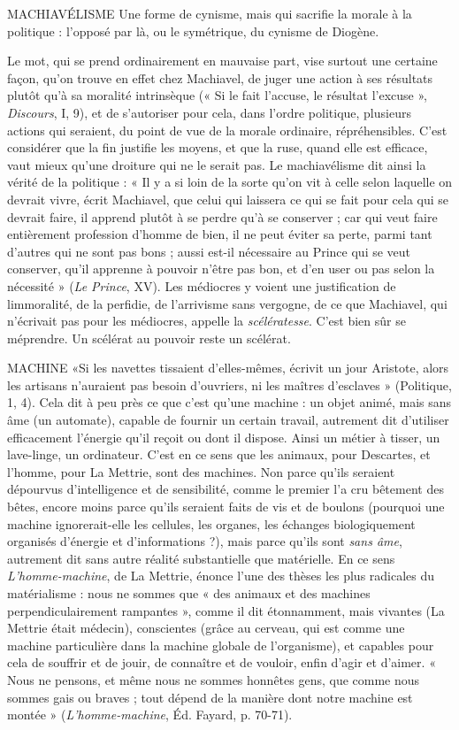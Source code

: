 

MACHIAVÉLISME Une forme de cynisme, mais qui sacrifie la morale à la
politique : l'opposé par là, ou le symétrique, du cynisme
de Diogène.

Le mot, qui se prend ordinairement en mauvaise part, vise surtout une certaine
façon, qu’on trouve en effet chez Machiavel, de juger une action à ses
résultats plutôt qu’à sa moralité intrinsèque (« Si le fait l’accuse, le résultat
l’excuse », {\it Discours}, I, 9), et de s’autoriser pour cela, dans l’ordre politique, plusieurs
actions qui seraient, du point de vue de la morale ordinaire, répréhensibles.
C’est considérer que la fin justifie les moyens, et que la ruse, quand elle
est efficace, vaut mieux qu’une droiture qui ne le serait pas. Le machiavélisme
dit ainsi la vérité de la politique : « Il y a si loin de la sorte qu’on vit à celle selon
laquelle on devrait vivre, écrit Machiavel, que celui qui laissera ce qui se fait
pour cela qui se devrait faire, il apprend plutôt à se perdre qu’à se conserver ;
car qui veut faire entièrement profession d'homme de bien, il ne peut éviter sa
perte, parmi tant d’autres qui ne sont pas bons ; aussi est-il nécessaire au Prince
qui se veut conserver, qu’il apprenne à pouvoir n'être pas bon, et d’en user ou
pas selon la nécessité » ({\it Le Prince}, XV). Les médiocres y voient une justification
de limmoralité, de la perfidie, de l’arrivisme sans vergogne, de ce que
Machiavel, qui n’écrivait pas pour les médiocres, appelle la {\it scélératesse}. C’est
bien sûr se méprendre. Un scélérat au pouvoir reste un scélérat.

MACHINE «Si les navettes tissaient d’elles-mêmes, écrivit un jour Aristote,
alors les artisans n'auraient pas besoin d’ouvriers, ni les
maîtres d'esclaves » (Politique, 1, 4). Cela dit à peu près ce que c’est qu’une
machine : un objet animé, mais sans âme (un automate), capable de fournir un
certain travail, autrement dit d’utiliser efficacement l'énergie qu’il reçoit ou
dont il dispose. Ainsi un métier à tisser, un lave-linge, un ordinateur. C’est en
ce sens que les animaux, pour Descartes, et l’homme, pour La Mettrie, sont des
machines. Non parce qu’ils seraient dépourvus d’intelligence et de sensibilité,
comme le premier l’a cru bêtement des bêtes, encore moins parce qu’ils seraient
faits de vis et de boulons (pourquoi une machine ignorerait-elle les cellules, les
organes, les échanges biologiquement organisés d'énergie et d’informations ?),
mais parce qu'ils sont {\it sans âme}, autrement dit sans autre réalité substantielle
que matérielle. En ce sens {\it L'homme-machine}, de La Mettrie, énonce l’une des
thèses les plus radicales du matérialisme : nous ne sommes que « des animaux
et des machines perpendiculairement rampantes », comme il dit étonnamment,
mais vivantes (La Mettrie était médecin), conscientes (grâce au cerveau, qui est
comme une machine particulière dans la machine globale de l'organisme), et
capables pour cela de souffrir et de jouir, de connaître et de vouloir, enfin d’agir
et d'aimer. « Nous ne pensons, et même nous ne sommes honnêtes gens, que
comme nous sommes gais ou braves ; tout dépend de la manière dont notre
machine est montée » ({\it L'homme-machine}, Éd. Fayard, p. 70-71).

